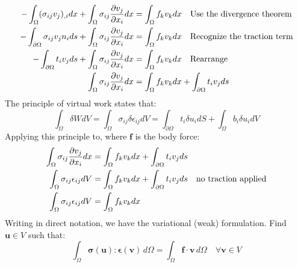 \documentclass[12pt,3p]{article}
\begin{document}
\begin{align*}
\begin{split}
- \int_{\Omega} (\sigma_{ij} v_j)_{,i} dx + \int_{\Omega} \sigma_{ij} \pdv{v_j}{x_i} dx &= \int_{\Omega} f_k v_k dx \quad \text{Use the divergence theorem} \\ 
- \int_{\partial \Omega} \sigma_{ij} v_j n_i ds + \int_{\Omega} \sigma_{ij} \pdv{v_j}{x_i} dx &= \int_{\Omega} f_k v_k dx \quad \text{Recognize the traction term} \\
- \int_{\partial \Omega} t_i v_j ds + \int_{\Omega} \sigma_{ij} \pdv{v_j}{x_i} dx &= \int_{\Omega} f_k v_k dx \quad \text{Rearrange} \\
 \int_{\Omega} \sigma_{ij} \pdv{v_j}{x_i} dx &= \int_{\Omega} f_k v_k dx + \int_{\partial \Omega} t_i v_j ds
\end{split}
\end{align*}
The principle of virtual work states that:
\begin{equation}\label{PVW}
\int_{\Omega} \delta W dV = \int_{\Omega} \sigma_{ij} \delta \epsilon_{ij} dV = \int_{\partial \Omega} t_i \delta u_i dS + \int_{\Omega} b_i \delta u_i dV 
\end{equation}
Applying this principle to, where $\mathbf{f}$ is  the body force: 
\begin{align*}
 \int_{\Omega} \sigma_{ij} \pdv{v_j}{x_i} dx &= \int_{\Omega} f_k v_k dx + \int_{\partial \Omega} t_i v_j ds \\
 \int_{\Omega} \sigma_{ij} \epsilon_{ij} dV &= \int_{\Omega} f_k v_k dx + \int_{\partial \Omega} t_i v_j ds \quad \text{no traction applied} \\
  \int_{\Omega} \sigma_{ij} \epsilon_{ij} dV &= \int_{\Omega} f_k v_k dx
\end{align*}
Writing in direct notation, we have the variational (weak) formulation. Find $\mathbf{u} \in V$ such that: 
\begin{equation}\label{EqWeakForm}
\int_{\Omega}  \bm{\sigma}(\mathbf{u}) : \bm{\epsilon}(\mathbf{v}) \, d \Omega = \int_{\Omega} \mathbf{ f \cdot v } \, d \Omega \quad \forall \mathbf{v} \in V 
\end{equation}
\end{document}
